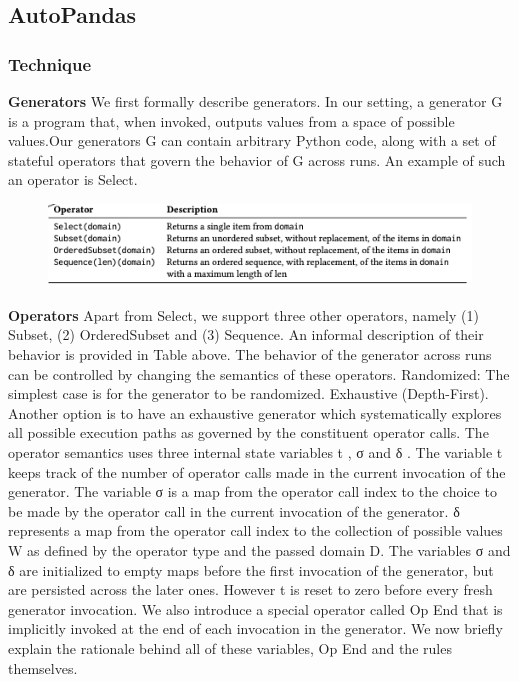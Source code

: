 \documentclass{article}
\begin{document}
\subsection{AutoPandas}
\subsubsection{Technique}
\textbf{Generators} We first formally describe generators. In our setting, a generator G is a program that, when invoked, outputs values from a space of possible values.Our generators G can contain arbitrary Python code, along with a set of stateful operators that govern the behavior of G across runs. An example of such an operator is Select.
\begin{figure}[ht]
\vskip 0.2in
\begin{center}
\centerline{\includegraphics[width=\columnwidth]{Images/Synthesis3-1.png}}
\label{icml-historical}
\end{center}
\vskip -0.2in
\end{figure}
\textbf{Operators} Apart from Select, we support three other operators, namely (1) Subset, (2) OrderedSubset and (3) Sequence. An informal description of their behavior is provided in Table above. The behavior of the generator across runs can be controlled by changing the semantics of these operators. 
Randomized: The simplest case is for the generator to be randomized.
Exhaustive (Depth-First). Another option is to have an exhaustive generator which systematically explores all possible execution paths as governed by the constituent operator calls. 
The operator semantics uses three internal state variables t , σ and δ . The variable t keeps track of the number of operator calls made in the current invocation of the generator. The variable σ is a map from the operator call index to the choice to be made by the operator call in the current invocation of the generator. δ represents a map from the operator call index to the collection of possible values W as defined by the operator type and the passed domain D. The variables σ and δ are initialized to empty maps before the first invocation of the generator, but are persisted across the later ones. However t is reset to zero before every fresh generator invocation. We also introduce a special operator called Op End that is implicitly invoked at the end of each invocation in the generator. We now briefly explain the rationale behind all of these variables, Op End and the rules themselves.
\end{document}
